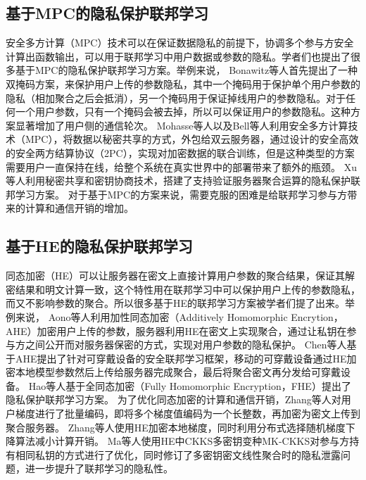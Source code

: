 \subsection{基于MPC的隐私保护联邦学习}
安全多方计算（MPC）技术可以在保证数据隐私的前提下，协调多个参与方安全计算出函数输出，可以用于联邦学习中用户数据或参数的隐私。学者们也提出了很多基于MPC的隐私保护联邦学习方案\cite{bonawitz2017practical, mohassel2017secureml, mugunthan2019smpai, reich2019privacy, sharma2019secure, so2020scalable, xu2019hybridalpha, zhu2020privacy}。举例来说，
Bonawitz等人\cite{bonawitz2017practical}首先提出了一种双掩码方案，来保护用户上传的参数隐私，其中一个掩码用于保护单个用户参数的隐私（相加聚合之后会抵消），另一个掩码用于保证掉线用户的参数隐私。对于任何一个用户参数，只有一个掩码会被去掉，所以可以保证用户的参数隐私。这种方案显著增加了用户侧的通信轮次。
Mohasse等人\cite{mohassel2017secureml}以及Bell等人\cite{bell2020secure}利用安全多方计算技术（MPC），将数据以秘密共享的方式，外包给双云服务器，通过设计的安全高效的安全两方结算协议（2PC），实现对加密数据的联合训练，但是这种类型的方案需要用户一直保持在线，给整个系统在真实世界中的部署带来了额外的瓶颈。
Xu等人\cite{xu2019hybridalpha}利用秘密共享\cite{shamir1979share}和密钥协商技术\cite{hellman1976new}，搭建了支持验证服务器聚合运算的隐私保护联邦学习方案。
对于基于MPC的方案来说，需要克服的困难是给联邦学习参与方带来的计算和通信开销的增加。


\subsection{基于HE的隐私保护联邦学习}
同态加密（HE）可以让服务器在密文上直接计算用户参数的聚合结果，保证其解密结果和明文计算一致，这个特性用在联邦学习中可以保护用户上传的参数隐私，而又不影响参数的聚合。所以很多基于HE的联邦学习方案\cite{asad2020fedopt, chen2020fedhealth, dong2020eastfly, hao2019efficient, hardy2017private, aono2017privacy, zhang2020batchcrypt, zhang2020privacy, zhao2020smss}被学者们提了出来。举例来说，
Aono等人\cite{aono2017privacy}利用加性同态加密（Additively Homomorphic Encrytion，AHE）加密用户上传的参数，服务器利用HE在密文上实现聚合，通过让私钥在参与方之间公开而对服务器保密的方式，实现对用户参数的隐私保护。
Chen等人\cite{chen2020fedhealth}基于AHE提出了针对可穿戴设备的安全联邦学习框架，移动的可穿戴设备通过HE加密本地模型参数然后上传给服务器完成聚合，最后将聚合密文再分发给可穿戴设备。
Hao等人基于全同态加密（Fully Homomorphic Encryption，FHE）\cite{brakerski2014leveled}提出了隐私保护联邦学习方案。
为了优化同态加密的计算和通信开销，Zhang等人\cite{zhang2020batchcrypt}对用户梯度进行了批量编码，即将多个梯度值编码为一个长整数，再加密为密文上传到聚合服务器。
Zhang等人\cite{zhang2020privacy}使用HE加密本地梯度，同时利用分布式选择随机梯度下降算法减小计算开销。
Ma等人\cite{ma2021privacy}使用HE中CKKS多密钥变种MK-CKKS对参与方持有相同私钥的方式进行了优化，同时修订了多密钥密文线性聚合时的隐私泄露问题，进一步提升了联邦学习的隐私性。


